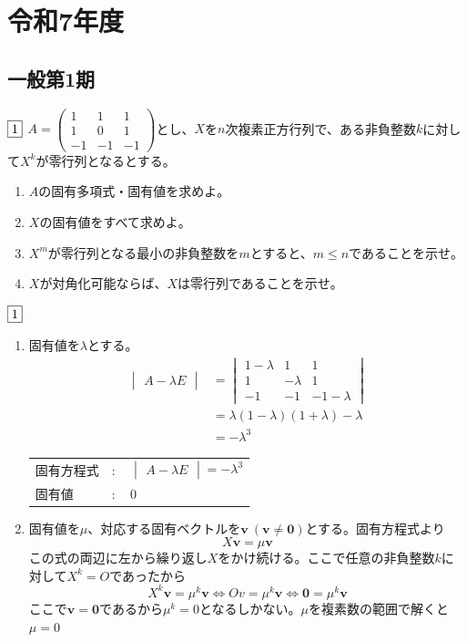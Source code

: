 \documentclass[dvipdfmx]{jsreport}
\begin{document}
\chapter{令和7年度}
\section{一般第1期}
\begin{tcolorbox} %
	$\fbox{1}$ $A= \begin{pmatrix}1& 1& 1\\ 1& 0& 1\\ {-1}& {-1}& {-1}\end{pmatrix}$とし、$X$を$n$次複素正方行列で、ある非負整数$k$に対して$X^k$が零行列となるとする。
\begin{enumerate}
	\item $A$の固有多項式・固有値を求めよ。
	\item $X$の固有値をすべて求めよ。
	\item $X^m$が零行列となる最小の非負整数を$m$とすると、$m\le n$であることを示せ。
	\item $X$が対角化可能ならば、$X$は零行列であることを示せ。
\end{enumerate}
\end{tcolorbox}

\begin{souanswer} %
	$\fbox{1}$
\begin{enumerate}
	\item 固有値を$\lambda$とする。
\begin{align*}
	\begin{vmatrix}A- \lambda E\end{vmatrix}
&= 
\begin{vmatrix}
	1- \lambda& 1& 1\\
	1& -\lambda& 1\\
	-1& -1& -1- \lambda
\end{vmatrix}\\
&= \lambda(1- \lambda)(1+ \lambda)- \lambda\\
&= -\lambda^3
\end{align*}
\begin{tabular}{lll}
	固有方程式& $\colon$& $\begin{vmatrix}A- \lambda E\end{vmatrix}= -\lambda^3$\\
	固有値& $\colon$& 0
\end{tabular}

	\item 固有値を$\mu$、対応する固有ベクトルを$\bm{v}\ (\bm{v}\ne \bm{0})$とする。固有方程式より
\begin{equation*}
	X\bm{v} = \mu \bm{v}
\end{equation*}
	この式の両辺に左から繰り返し$X$をかけ続ける。ここで任意の非負整数$k$に対して$X^k= O$であったから
\begin{equation*}
	X^k\bm{v}= \mu^k \bm{v}\iff Ov= \mu^k \bm{v}\iff \bm{0}= \mu^k \bm{v}
\end{equation*}
	ここで$\bm{v}= \bm{0}$であるから$\mu^k= 0$となるしかない。$\mu$を複素数の範囲で解くと$\mu= 0$
\end{enumerate}
\end{souanswer}
\end{document}
